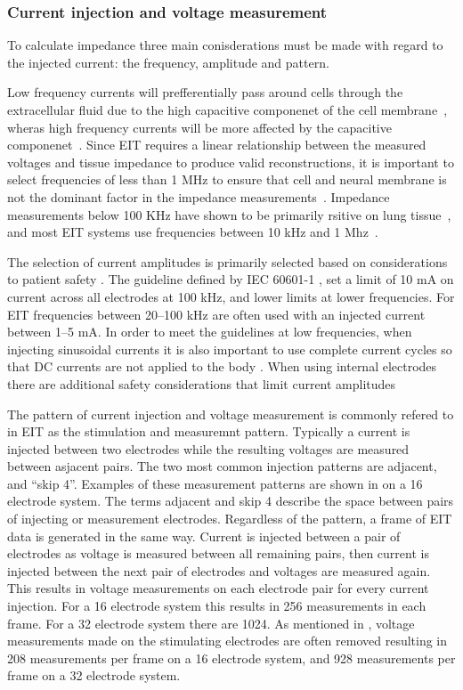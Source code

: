 \subsubsection{Current injection and voltage measurement}
To calculate impedance three main conisderations must be made with regard to the 
injected current: the frequency, amplitude and pattern. 

Low frequency currents will 
prefferentially pass around cells through the extracellular
fluid due to the high capacitive componenet of the cell 
membrane~\parencite{foster_whole-body_1996}, wheras high frequency currents will be 
more affected by the capacitive 
componenet~\parencite{holder_electrical_2004}. 
Since EIT requires a linear relationship between the measured voltages and 
tissue impedance to produce valid reconstructions,
it is important to select frequencies of less than 1 MHz to ensure that cell 
and neural membrane is not the dominant factor in the impedance 
measurements~\parencite{barber_applied_1984}.
Impedance measurements below 100 KHz have shown to be primarily rsitive on lung
tissue~\parencite{witsoe_electrical_1967}, and most EIT systems use
frequencies between 10 kHz and 1 Mhz~\parencite{holder_electrical_2004}.

The selection of current amplitudes is primarily selected based on 
considerations to patient safety \parencite{adler_electrical_2017}.
The guideline defined by IEC 60601-1 
\parencite{international_electrotechnical_commission_iec_2021}, set a limit 
of 10 mA on current across all electrodes at 100 kHz, and lower limits 
at lower frequencies. 
For EIT frequencies between 20--100 kHz are often used with an injected current 
between 1--5 mA.
In order to meet the 
guidelines at low frequencies,
when injecting sinusoidal currents it is also important to use complete current cycles 
so that DC currents are not applied to the body \parencite{adler_electrical_2017}.
When using internal electrodes there are additional safety considerations that limit
current amplitudes

The pattern of current injection and voltage measurement is commonly refered to in EIT 
as the stimulation and measuremnt pattern. Typically a current is injected between two electrodes
while the resulting voltages are measured between asjacent pairs. The two most common injection 
patterns are adjacent, and ``skip 4''. Examples of these measurement patterns are shown in 
 on a 16 electrode system. The terms adjacent and skip 4 describe 
the space between pairs of injecting or measurement electrodes. 
Regardless of the pattern, a frame of EIT data is generated in the same way. 
Current is injected between a pair of electrodes as voltage is measured between all 
remaining pairs, then current is injected between the next pair of electrodes and
voltages are measured again. This results in voltage measurements on each electrode 
pair for every current injection. For a 16 electrode system this results in 
256 measurements in each frame. For a 32 electrode system there are 1024. As mentioned in 
, voltage measurements made on the stimulating electrodes
are often removed resulting in 208 measurements per frame on a 16
electrode system, and 928 measurements per frame on a 32 electrode system.  

